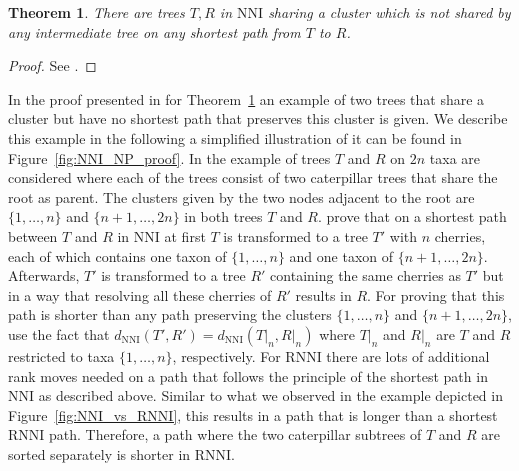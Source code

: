 \documentclass{amsart}
\newcommand{\nni}{\mathrm{NNI}}
\newcommand{\rnni}{\mathrm{RNNI}}
\newtheorem{theorem}[definition]{Theorem}
\begin{document}
\begin{theorem}
There are trees $T,R$ in $\nni$ sharing a cluster which is not shared by any intermediate tree on any shortest path from $T$ to $R$.
\label{thm:split_nni}
\end{theorem}

\begin{proof}
See \autocite{Li1996-zw}.
\end{proof}

In the proof presented in \autocite{Li1996-zw} for Theorem~\ref{thm:split_nni} an example of two trees that share a cluster but have no shortest path that preserves this cluster is given.
We describe this example in the following a simplified illustration of it can be found in Figure~\ref{fig:NNI_NP_proof}.
In the example of \autocite{Li1996-zw} trees $T$ and $R$ on $2n$ taxa are considered where each of the trees consist of two caterpillar trees that share the root as parent.
The clusters given by the two nodes adjacent to the root are $\{1, \ldots, n\}$ and $\{n+1, \ldots, 2n\}$ in both trees $T$ and $R$.
\autocite{Li1996-zw} prove that on a shortest path between $T$ and $R$ in $\nni$ at first $T$ is transformed to a tree $T'$ with $n$ cherries, each of which contains one taxon of $\{1, \ldots, n\}$ and one taxon of $\{n+1, \ldots, 2n\}$.
Afterwards, $T'$ is transformed to a tree $R'$ containing the same cherries as $T'$ but in a way that resolving all these cherries of $R'$ results in $R$.
For proving that this path is shorter than any path preserving the clusters $\{1, \ldots, n\}$ and $\{n+1, \ldots, 2n\}$, \autocite{Li1996-zw} use the fact that $d_{\nni}(T',R') = d_{\nni}(T{\big|}_n, R{\big|}_n)$ where $T{\big|}_n$ and $R{\big|}_n$ are $T$ and $R$ restricted to taxa $\{1,\ldots,n\}$, respectively.
For $\rnni$ there are lots of additional rank moves needed on a path that follows the principle of the shortest path in $\nni$ as described above.
Similar to what we observed in the example depicted in Figure~\ref{fig:NNI_vs_RNNI}, this results in a path that is longer than a shortest $\rnni$ path.
Therefore, a path where the two caterpillar subtrees of $T$ and $R$ are sorted separately is shorter in $\rnni$.
\end{document}
